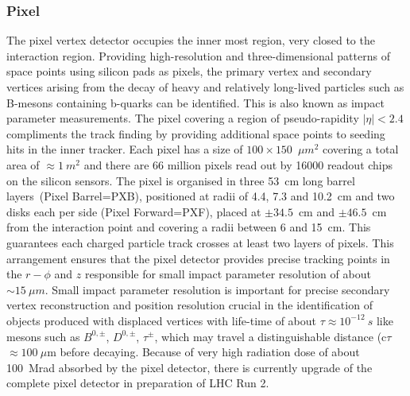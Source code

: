 \subsubsection{Pixel}
The pixel vertex detector occupies the inner most region, very closed to the interaction region. Providing high-resolution and three-dimensional patterns of space points using silicon pads as pixels, the primary vertex and secondary vertices arising from the decay of heavy and relatively long-lived particles such as B-mesons containing b-quarks can be identified. This is also known as impact parameter measurements. The pixel covering a region of pseudo-rapidity $|\eta| < 2.4$ compliments the track finding by providing additional space points to seeding hits in the inner tracker.  Each pixel has a size of $100\times150$~$\mu m^2$ 
covering a total area of $\approx 1~m^{2}$ and there are 66 million pixels read out by 16000 readout chips on the silicon sensors. The pixel is organised in three 53~cm long barrel layers~(Pixel Barrel=PXB), positioned at radii  of 4.4, 7.3 and 10.2~cm and two disks each per side (Pixel Forward=PXF), placed at $\pm 34.5$~cm and $\pm46.5$~cm from the interaction point and covering a radii between 6 and 15~cm. This guarantees each charged particle track crosses at least two layers of pixels.
This arrangement ensures that the pixel detector provides  precise tracking points in the $ r-\phi$ and $z$ responsible for small impact parameter resolution of about $\sim 15~\mu m$. Small impact parameter resolution is important for precise secondary vertex  reconstruction and position resolution crucial in the identification of objects produced with displaced vertices with life-time of  about $\tau \approx 10^{-12}~s$ like mesons such as $B^{0,{\pm}}$, $D^{0,{\pm}}$, $\tau^{\pm}$, which may travel a distinguishable distance (c$\tau$ $\approx 100~\mu$m before decaying. Because of very high radiation dose of about 100~Mrad absorbed by the pixel detector, there is currently upgrade of the complete pixel detector in preparation of LHC Run 2.


